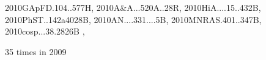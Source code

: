 \documentclass[12pt]{article}
\begin{document}
\begin{description}
{2010GApFD.104..577H,%
2010A&A...520A..28R,%
2010HiA....15..432B,%
2010PhST..142a4028B,%
2010AN....331....5B,%
2010MNRAS.401..347B,%
2010cosp...38.2826B%
},\item
35 times in 2009 \citep{
2009ApJ...707.1233Y,%
2009PhRvE..80e5301B,%
2009MNRAS.400..509R,%
2009ApJ...704.1239O,%
2009A&A...505..955S,%
2009ApJ...701.1269B,%
2009AN....330..797V,%
2009MNRAS.397...64H,%
2009ApJ...699.1059K,%
2009ApJ...697.1269J,%
2009ApJ...704L..75J,%
2009ApJS..182..468M,%
2009MmSAI..80..654Z,%
2009AdSpR..43.1451Z,%
2009ASPC..406....9F,%
2009A&A...495....1M,%
}
\end{description}
\end{document}
